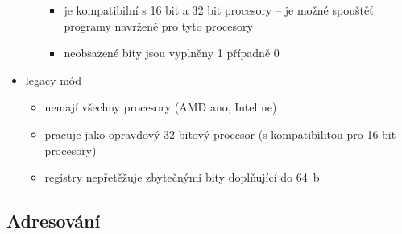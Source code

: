\documentclass[a4paper,12pt]{article}
\providecommand{\tightlist}{%
\setlength{\itemsep}{0pt}\setlength{\parskip}{0pt}}
\begin{document}
\begin{itemize}
\begin{itemize}
    \begin{itemize}
    \tightlist
    \item je kompatibilní s 16 bit a 32 bit procesory -- je možné spouštěť
      programy navržené pro tyto procesory
    \item neobsazené bity jsou vyplněny 1 případně 0
    \end{itemize}
  \end{itemize}
\item legacy mód

  \begin{itemize}
  \tightlist
  \item nemají všechny procesory (AMD ano, Intel ne)
  \item pracuje jako opravdový 32 bitový procesor (s kompatibilitou pro 16
    bit procesory)
  \item registry nepřetěžuje zbytečnými bity doplňující do 64~b
  \end{itemize}
\end{itemize}

\subsection{Adresování}
\end{document}
